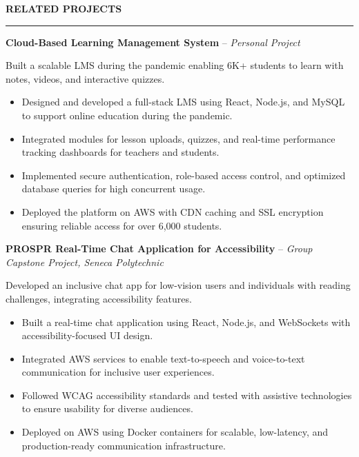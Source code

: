 \documentclass[10pt,letterpaper]{article}
\begin{document}
\vspace{6pt}

\textbf{RELATED PROJECTS}\\[-8pt]
\noindent\rule{\textwidth}{1pt}

\vspace{-2pt}

\textbf{Cloud-Based Learning Management System} -- \emph{Personal Project}

\vspace{-1pt}

Built a scalable LMS during the pandemic enabling 6K+ students to learn with notes, videos, and interactive quizzes.
\vspace{-1pt}
\begin{itemize}
\item Designed and developed a full-stack LMS using React, Node.js, and MySQL to support online education during the pandemic.
\item Integrated modules for lesson uploads, quizzes, and real-time performance tracking dashboards for teachers and students.
\item Implemented secure authentication, role-based access control, and optimized database queries for high concurrent usage.
\item Deployed the platform on AWS with CDN caching and SSL encryption ensuring reliable access for over 6,000 students.
\end{itemize}

\textbf{PROSPR  Real-Time Chat Application for Accessibility} -- \emph{Group Capstone Project, Seneca Polytechnic}

\vspace{-1pt}

Developed an inclusive chat app for low-vision users and individuals with reading challenges, integrating accessibility features.
\vspace{-1pt}
\begin{itemize}
\item Built a real-time chat application using React, Node.js, and WebSockets with accessibility-focused UI design.
\item Integrated AWS services to enable text-to-speech and voice-to-text communication for inclusive user experiences.
\item Followed WCAG accessibility standards and tested with assistive technologies to ensure usability for diverse audiences.
\item Deployed on AWS using Docker containers for scalable, low-latency, and production-ready communication infrastructure.
\end{itemize}
\end{document}
